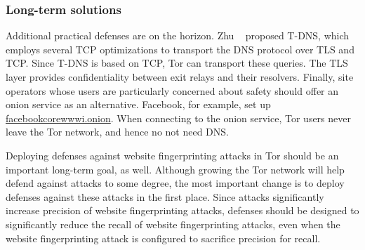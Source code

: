\subsubsection{Long-term solutions}
\label{sec:long-term}

Additional practical defenses are on the horizon.  Zhu \ea~\cite{Zhu2015a} proposed
T-DNS, which employs several TCP optimizations to transport the DNS protocol
over TLS and TCP.  Since T-DNS is based on TCP, Tor can transport these queries.
The TLS layer provides confidentiality between exit relays and their resolvers.
Finally, site operators whose users are particularly concerned about
safety should offer an onion service as an alternative.  Facebook, for example,
set up \url{facebookcorewwwi.onion}.  When
connecting to the onion service, Tor users never leave the Tor network, and
hence no not need DNS.

Deploying defenses against website fingerprinting attacks in Tor should be an
important long-term goal, as well.
Although growing the Tor network will help defend against \name attacks to some
degree, the most important change is to
deploy defenses against these attacks in the first place.  Since \name attacks
significantly increase precision of website fingerprinting attacks, defenses
should be designed to significantly reduce the recall of website fingerprinting
attacks, even when the website fingerprinting attack is configured to sacrifice
precision for recall.
